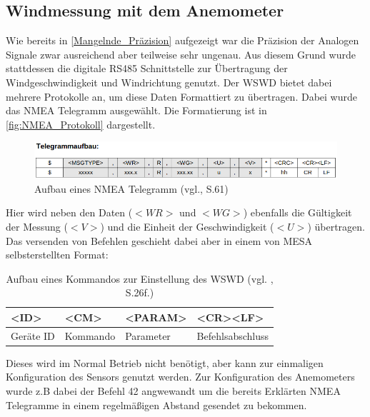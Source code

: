 \subsection{Windmessung mit dem Anemometer}
Wie bereits in \autoref{Mangelnde_Präzision} aufgezeigt war die Präzision der Analogen Signale zwar ausreichend aber teilweise sehr ungenau. Aus diesem Grund wurde stattdessen die digitale RS485 Schnittstelle zur Übertragung der Windgeschwindigkeit und Windrichtung genutzt. Der WSWD bietet dabei mehrere Protokolle an, um diese Daten Formattiert zu übertragen. Dabei wurde das \ac{NMEA} Telegramm ausgewählt. Die Formatierung ist in \autoref{fig:NMEA_Protokoll} dargestellt.
\begin{figure}[H]
	\centering
	\includegraphics[width=\linewidth]{images/Software/NMEA_Telegramm_Aufbau.png}
	\caption{Aufbau eines NMEA Telegramm (vgl.\cite{WSWD}, S.61)}
	\label{fig:NMEA_Protokoll}
\end{figure}
\noindent Hier wird neben den Daten ($<WR>$ und $<WG>$) ebenfalls die Gültigkeit der Messung ($<V>$) und die Einheit der Geschwindigkeit ($<U>$) übertragen. Das versenden von Befehlen geschieht dabei aber in einem von MESA selbsterstellten Format:
\begin{table}[H]
	\centering
	\begin{tabular}{|l|l|l|l|}
		\hline
		\textbf{\textless{}ID\textgreater{}} & \textbf{\textless{}CM\textgreater{}} & \textbf{\textless{}PARAM\textgreater{}} & \textbf{\textless{}CR\textgreater{}\textless{}LF\textgreater{}} \\ \hline
		Geräte ID                            & Kommando                             & Parameter                               & Befehlsabschluss                                                \\ \hline
	\end{tabular}
	\caption{Aufbau eines Kommandos zur Einstellung des WSWD (vgl. \cite{WSWD}, S.26f.)}
	\label{tab:my-table}
\end{table}
\noindent Dieses wird im Normal Betrieb nicht benötigt, aber kann zur einmaligen Konfiguration des Sensors genutzt werden. Zur Konfiguration des Anemometers wurde z.B dabei der Befehl 42 angwewandt um die bereits Erklärten \ac{NMEA} Telegramme in einem regelmäßigen Abstand gesendet zu bekommen.\\

